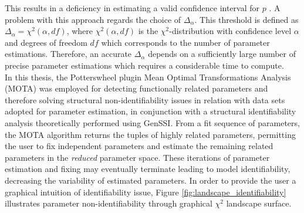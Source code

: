 This results in a deficiency in estimating a valid confidence interval for $p$ \citep{Raue2009, Raue2010, Raue2011, Kreutz2012}. A problem with this approach regards the choice of $\Delta_\alpha$. This threshold is defined as $\Delta_\alpha = \chi^2(\alpha, df)$, where $\chi^2(\alpha, df)$ is the $\chi^2$-distribution with confidence level $\alpha$ and degrees of freedom $df$ which corresponds to the number of parameter estimations. Therefore, an accurate $\Delta_\alpha$ depends on a sufficiently large number of precise parameter estimations which requires a considerable time to compute.\\ 
In this thesis, the Potterswheel plugin Mean Optimal Transformations Analysis (MOTA) \citep{Hengl2007} was employed for detecting functionally related parameters and therefore solving structural non-identifiability issues in relation with data sets adopted for parameter estimation, in conjunction with a structural identifiability analysis theoretically performed using GenSSI. From a fit sequence of parameters, the MOTA algorithm returns the tuples of highly related parameters, permitting the user to fix independent parameters and estimate the remaining related parameters in the \emph{reduced} parameter space. These iterations of parameter estimation and fixing may eventually terminate leading to model identifiability, decreasing the variability of estimated parameters. In order to provide the user a graphical intuition of identifiability issue, Figure \ref{fig:landscape_identifiability} illustrates parameter non-identifiability through graphical $\chi^2$ landscape surface.

